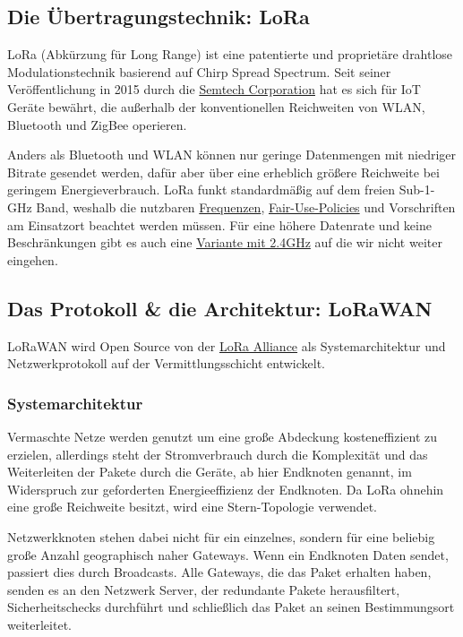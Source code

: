 \documentclass[12pt]{article}
\begin{document}
    \subsection{Die Übertragungstechnik: LoRa}
      LoRa (Abkürzung für Long Range) ist eine patentierte und proprietäre drahtlose Modulationstechnik basierend auf Chirp Spread Spectrum.
      Seit seiner Veröffentlichung in 2015 durch die \href{www.semtech.com}{Semtech Corporation} hat es sich für
      IoT Geräte bewährt, die außerhalb der konventionellen Reichweiten von WLAN, Bluetooth und ZigBee operieren.

      Anders als Bluetooth und WLAN können nur geringe Datenmengen mit niedriger Bitrate gesendet werden,
      dafür aber über eine erheblich größere Reichweite bei geringem Energieverbrauch. LoRa funkt standardmäßig auf dem freien Sub-1-GHz Band,
      weshalb die nutzbaren \href{https://www.thethingsnetwork.org/docs/lorawan/frequencies-by-country/}{Frequenzen}, \href{https://www.thethingsnetwork.org/docs/lorawan/duty-cycle/}{Fair-Use-Policies}
      und Vorschriften am Einsatzort beachtet werden müssen. Für eine höhere Datenrate und keine Beschränkungen gibt es auch eine
      \href{https://www.semtech.com/products/wireless-rf/lora-24ghz}{Variante mit 2.4GHz} auf die wir nicht weiter eingehen.



    \subsection{Das Protokoll \& die Architektur: LoRaWAN}
      LoRaWAN wird Open Source von der \href{https://lora-alliance.org/}{LoRa Alliance} als Systemarchitektur und Netzwerkprotokoll
      auf der Vermittlungsschicht entwickelt.

      \subsubsection{Systemarchitektur}
        Vermaschte Netze werden genutzt um eine große Abdeckung kosteneffizient zu erzielen, allerdings steht der Stromverbrauch durch die Komplexität und das
        Weiterleiten der Pakete durch die Geräte, ab hier Endknoten genannt, im Widerspruch zur geforderten Energieeffizienz der Endknoten.
        Da LoRa ohnehin eine große Reichweite besitzt, wird eine Stern-Topologie verwendet.

        Netzwerkknoten stehen dabei nicht für ein einzelnes, sondern für
        eine beliebig große Anzahl geographisch naher Gateways. Wenn ein Endknoten Daten sendet, passiert dies durch Broadcasts.
        Alle Gateways, die das Paket erhalten haben, senden es an den Netzwerk Server, der redundante Pakete herausfiltert,
        Sicherheitschecks durchführt und schließlich das Paket an seinen Bestimmungsort weiterleitet.
\end{document}
